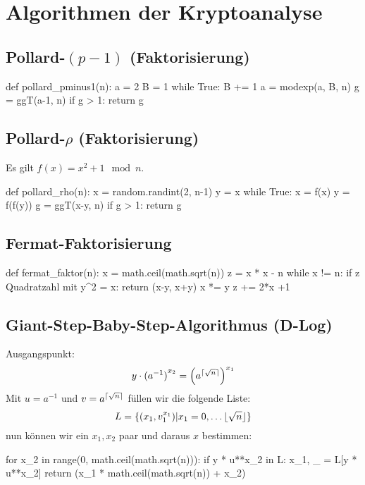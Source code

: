 \chapter{Algorithmen der Kryptoanalyse}
\section{Pollard-$(p-1)$ (Faktorisierung)}
\begin{python}
def pollard_pminus1(n):
    a = 2
    B = 1
    while True:
        B += 1
        a = modexp(a, B, n)
        g = ggT(a-1, n)
        if g > 1:
            return g
\end{python}

\section{Pollard-$\rho$ (Faktorisierung)}
Es gilt $f(x) = x^2 + 1 \mod n$.
\begin{python}
def pollard_rho(n):
    x = random.randint(2, n-1)
    y = x
    while True:
        x = f(x)
        y = f(f(y))
        g = ggT(x-y, n)
        if g > 1:
            return g
\end{python}

\section{Fermat-Faktorisierung}
\begin{python}
def fermat_faktor(n):
    x = math.ceil(math.sqrt(n))
    z = x * x - n
    while x != n:
        if z Quadratzahl mit y^2 = x:
            return (x-y, x+y)
        x *= y
        z += 2*x +1
\end{python}

\section{Giant-Step-Baby-Step-Algorithmus (D-Log)}
Ausgangspunkt:
\begin{equation}
    y \cdot {(a^{-1})}^{x_2} = {\left(a^{\lceil\sqrt{n}\rceil}\right)}^{x_1}
\end{equation}
Mit $u=a^{-1}$ und $v=a^{\lceil\sqrt{n}\rceil}$ füllen wir die folgende Liste:
\begin{equation}
    L = \{(x_1, v_1^{x_1}) | x_1 = 0, \ldots \lfloor\sqrt{n}\rfloor \}
\end{equation}
nun können wir ein $x_1, x_2$ paar und daraus $x$ bestimmen:
\begin{python}
    for x_2 in range(0, math.ceil(math.sqrt(n))):
        if y * u**x_2 in L:
            x_1, _ = L[y * u**x_2]
            return (x_1 * math.ceil(math.sqrt(n)) + x_2)
\end{python}

